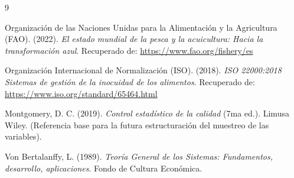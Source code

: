 \documentclass[11pt,a4paper]{article}
\begin{document}
\begin{itemize}
\renewcommand{\refname}{Webgrafía y Referencias}
\begin{thebibliography}{9}

Organización de las Naciones Unidas para la Alimentación y la Agricultura (FAO). (2022). 
\textit{El estado mundial de la pesca y la acuicultura: Hacia la transformación azul}. Recuperado de: \url{https://www.fao.org/fishery/es}

Organización Internacional de Normalización (ISO). (2018). 
\textit{ISO 22000:2018 Sistemas de gestión de la inocuidad de los alimentos}. Recuperado de: \url{https://www.iso.org/standard/65464.html}


Montgomery, D. C. (2019). 
\textit{Control estadístico de la calidad} (7ma ed.). Limusa Wiley. (Referencia base para la futura estructuración del muestreo de las variables).

Von Bertalanffy, L. (1989). 
\textit{Teoría General de los Sistemas: Fundamentos, desarrollo, aplicaciones}. Fondo de Cultura Económica.

\end{thebibliography}   
    
    
    
\end{itemize}
\end{document}
